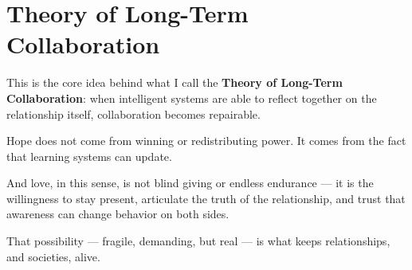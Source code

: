 \documentclass{article}
\begin{document}
\section*{Theory of Long-Term Collaboration}

This is the core idea behind what I call the \textbf{Theory of Long-Term Collaboration}: when intelligent systems are able to reflect together on the relationship itself, collaboration becomes repairable.

Hope does not come from winning or redistributing power.
It comes from the fact that learning systems can update.

And love, in this sense, is not blind giving or endless endurance — it is the willingness to stay present, articulate the truth of the relationship, and trust that awareness can change behavior on both sides.

That possibility — fragile, demanding, but real — is what keeps relationships, and societies, alive.
\end{document}
